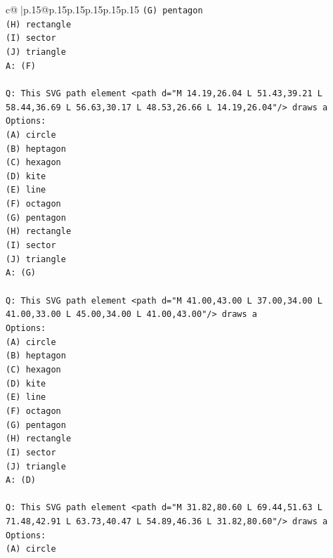 \documentclass{article}
\begin{document}
{\begin{supertabular}{c@{$\;$}|p{.15\linewidth}@{}p{.15\linewidth}p{.15\linewidth}p{.15\linewidth}p{.15\linewidth}p{.15\linewidth}}
{{{\texttt{(G) pentagon} \\
\texttt{(H) rectangle} \\
\texttt{(I) sector} \\
\texttt{(J) triangle} \\
\texttt{A: (F)} \\
\\ 
\texttt{Q: This SVG path element <path d="M 14.19,26.04 L 51.43,39.21 L 58.44,36.69 L 56.63,30.17 L 48.53,26.66 L 14.19,26.04"/> draws a} \\
\texttt{Options:} \\
\texttt{(A) circle} \\
\texttt{(B) heptagon} \\
\texttt{(C) hexagon} \\
\texttt{(D) kite} \\
\texttt{(E) line} \\
\texttt{(F) octagon} \\
\texttt{(G) pentagon} \\
\texttt{(H) rectangle} \\
\texttt{(I) sector} \\
\texttt{(J) triangle} \\
\texttt{A: (G)} \\
\\ 
\texttt{Q: This SVG path element <path d="M 41.00,43.00 L 37.00,34.00 L 41.00,33.00 L 45.00,34.00 L 41.00,43.00"/> draws a} \\
\texttt{Options:} \\
\texttt{(A) circle} \\
\texttt{(B) heptagon} \\
\texttt{(C) hexagon} \\
\texttt{(D) kite} \\
\texttt{(E) line} \\
\texttt{(F) octagon} \\
\texttt{(G) pentagon} \\
\texttt{(H) rectangle} \\
\texttt{(I) sector} \\
\texttt{(J) triangle} \\
\texttt{A: (D)} \\
\\ 
\texttt{Q: This SVG path element <path d="M 31.82,80.60 L 69.44,51.63 L 71.48,42.91 L 63.73,40.47 L 54.89,46.36 L 31.82,80.60"/> draws a} \\
\texttt{Options:} \\
\texttt{(A) circle} \\
}}}
\end{supertabular}}
\end{document}
